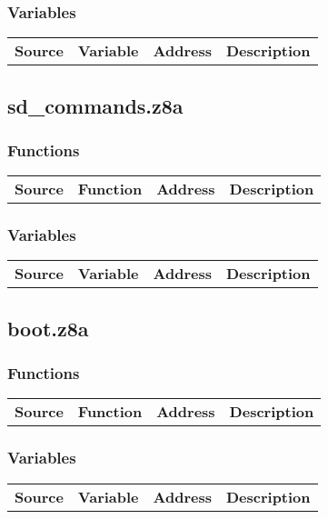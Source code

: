 \subsubsection{Variables}
\begin{tabular}{rllp{7cm}}
 \textbf{Source}&\textbf{Variable}&\textbf{Address}&\textbf{Description}\\
\end{tabular}

\subsection{sd\_commands.z8a}
\subsubsection{Functions}
\begin{tabular}{rllp{7cm}}
 \textbf{Source}&\textbf{Function}&\textbf{Address}&\textbf{Description}\\
\end{tabular}

\subsubsection{Variables}
\begin{tabular}{rllp{7cm}}
 \textbf{Source}&\textbf{Variable}&\textbf{Address}&\textbf{Description}\\
\end{tabular}

\subsection{boot.z8a}
\subsubsection{Functions}
\begin{tabular}{rllp{7cm}}
 \textbf{Source}&\textbf{Function}&\textbf{Address}&\textbf{Description}\\
\end{tabular}

\subsubsection{Variables}
\begin{tabular}{rllp{7cm}}
 \textbf{Source}&\textbf{Variable}&\textbf{Address}&\textbf{Description}\\
\end{tabular}

